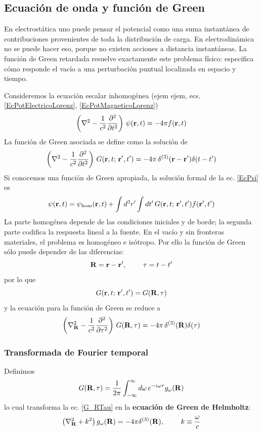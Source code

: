 \documentclass[]{article}
\numberwithin{equation}{section}
\begin{document}
\subsection{Ecuación de onda y función de Green}
En electrostática uno puede pensar el potencial como una suma instantánea de contribuciones provenientes de toda la distribución de carga.
En electrodinámica no se puede hacer eso, porque no existen acciones a distancia instantáneas.
La función de Green retardada resuelve exactamente este problema físico: especifica cómo responde el vacío a una perturbación puntual localizada en espacio y tiempo.

Consideremos la ecuación escalar inhomogénea (ejem ejem, ecs. \ref{EcPotElectricoLorenz}, \ref{EcPotMagneticoLorenz})
\begin{equation}
	\left(\nabla^2 - \frac{1}{c^2} \dfrac{\partial ^2}{\partial t^2}\right)\, \psi(\mathbf{r},t) = -4 \pi f(\mathbf{r}, t) \label{EcPsi}
\end{equation}
La función de Green asociada se define como la solución de
\begin{equation}
		\left(\nabla^2 - \frac{1}{c^2} \dfrac{\partial ^2}{\partial t^2}\right)\, G(\mathbf{r},t; \, \mathbf{r}', t') = -4\pi \, \delta^{(3)}(\mathbf{r} - \mathbf{r}')\delta(t - t')
\end{equation}
Si conocemos una función de Green apropiada, la solución formal de la ec. \ref{EcPsi} es
\begin{equation}
	\psi(\mathbf{r},t) = \psi_{\mathrm{hom}}(\mathbf{r},t) + \int d^3 r' \int dt'\, G(\mathbf{r},t; \, \mathbf{r}', t') f(\mathbf{r}', t') \label{psiGreen}
\end{equation}
La parte homogénea depende de las condiciones iniciales y de borde; la segunda parte codifica la respuesta lineal a la fuente. En el vacío y sin fronteras materiales, el problema es homogéneo e isótropo. Por ello la función de Green sólo puede depender de las diferencias:
\begin{equation}
	\mathbf{R} = \mathbf{r} - \mathbf{r}', ~~~~~~~ \tau = t - t'
\end{equation}
por lo que
\begin{equation}
	G(\mathbf{r},t; \, \mathbf{r}', t') = G(\mathbf{R}, \tau)
\end{equation}
y la ecuación para la función de Green se reduce a
\begin{equation}
	\left(\nabla^2_{\mathbf{R}} - \frac{1}{c^2} \dfrac{\partial ^2}{\partial \tau^2}\right)\, G(\mathbf{R}, \tau) = -4\pi \, \delta^{(3)}(\mathbf{R})\delta(\tau) \label{G_RTau}
\end{equation}

\subsubsection{Transformada de Fourier temporal}
Definimos
\begin{equation}
	G(\mathbf{R}, \tau) = \frac{1}{2\pi} \int_{-\infty}^{\infty} d\omega\, e^{-i\omega\tau} g_{\omega}(\mathbf{R}) \label{GreenFourier}
\end{equation}
lo cual transforma la ec. \ref{G_RTau} en la \textbf{ecuación de Green de Helmholtz}:
\begin{equation*}
	\left(\nabla^2_{\mathbf{R}} + k^2\right) g_{\omega}(\mathbf{R}) = -4\pi \delta^{(3)}(\mathbf{R}), ~~~~~~~ k \equiv \frac{\omega}{c}
\end{equation*}
\end{document}
